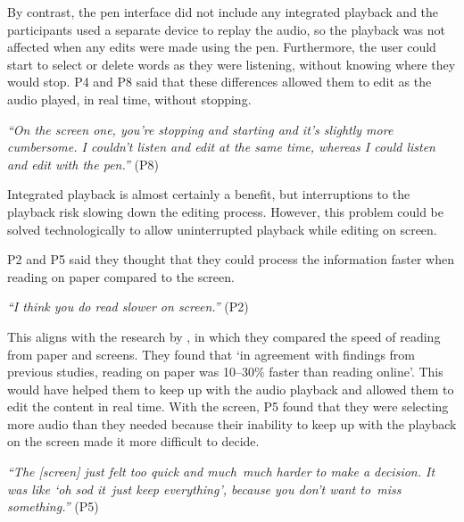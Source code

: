 By contrast, the pen interface did not include any integrated playback and the participants used a separate device to
replay the audio, so the playback was not affected when any edits were made using the pen. Furthermore, the user could
start to select or delete words as they were listening, without knowing where they would stop.  P4 and P8 said that
these differences allowed them to edit as the audio played, in real time, without stopping.

\textit{``On the screen one, you're stopping and starting and it's slightly more cumbersome. I couldn't listen and edit
at the same time, whereas I could listen and edit with the pen.''} (P8)

Integrated playback is almost certainly a benefit, but interruptions to the playback risk slowing down the editing
process. However, this problem could be solved technologically to allow uninterrupted playback while editing on screen.


P2 and P5 said they thought that they could process the information faster when reading on paper compared to the
screen.

\textit{``I think you do read slower on screen.''} (P2)

This aligns with the research by \citet{Kurniawan2001}, in which they compared the speed of reading from paper and
screens. They found that `in agreement with findings from previous studies, reading on paper was 10--30\% faster than
reading online'.  This would have helped them to keep up with the audio playback and allowed them to edit the content
in real time. With the screen, P5 found that they were selecting more audio than they needed because their inability to
keep up with the playback on the screen made it more difficult to decide.

\textit{``The [screen] just felt too quick and much much harder to make a decision. It was like `oh sod it just keep
everything', because you don't want to miss something.''} (P5)


